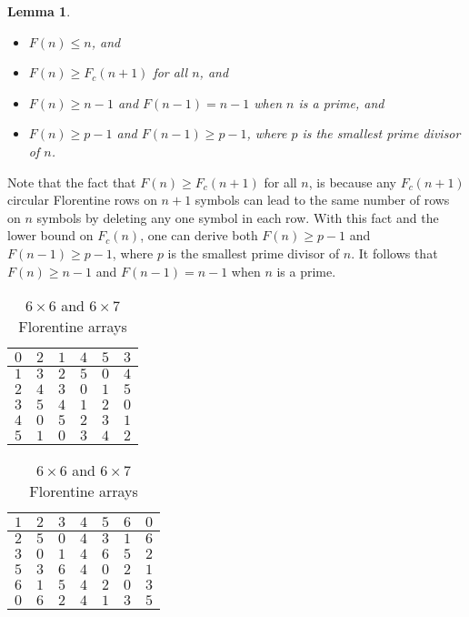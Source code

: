 \documentclass[conference,letterpaper]{IEEEtran}
\newtheorem{lemma}{Lemma}
\theoremstyle{definition}
\begin{document}
\begin{lemma}\cite{TAYLOR1991}\label{FB}
\begin{itemize}
\item[(1)]$F(n)\leq n$, and
\item[(2)]$F(n) \geq F_{c}(n+1)$ for all $n$, and
\item[(3)] $F(n) \geq n-1$ and $F(n-1) = n-1$ when $n$ is a prime, and 
\item[(4)] $F(n) \geq p-1$ and $F(n-1) \geq p-1$, where $p$ is the smallest prime divisor of $n$.
\end{itemize}
\end{lemma}

Note that  the fact that $F(n) \geq F_{c}(n+1)$ for all $n$, is because any $F_{c}(n+1)$ circular Florentine rows on $n+1$ symbols can lead to the same number of rows on $n$ symbols by deleting any one symbol in each row.  With this fact and the lower bound on  $F_{c}(n)$, one can derive both $F(n) \geq p-1$ and $F(n-1) \geq p-1$, where $p$ is the smallest prime divisor of 
$n$. It follows that $F(n) \geq n-1$ and $F(n-1) = n-1$ when $n$ is a prime.

\begin{table}[!h]
\caption{ $6 \times 6$  and $6 \times 7$ Florentine arrays \cite{Colbourn}}

\parbox{.4\linewidth}{
\centering
\begin{tabular}{|c|c|c|c|c|c|}
\hline
$ 0$ & $2$ & $1$ & $4$ & $5$ & $3$  \\ \hline
$ 1$ & $3$ & $2$ & $5$ & $0$ & $4$  \\ \hline
$ 2$ & $4$ & $3$ & $0$ & $1$ & $5$   \\ \hline
$ 3$ & $5$ & $4$ & $1$ & $2$ & $0$   \\ \hline
$ 4$ & $0$ & $5$ & $2$ & $3$ & $1$   \\ \hline
$5$ & $1$ & $0$ & $3$ & $4$ & $2$   \\ \hline
\end{tabular}
\label{Florentineexample}
}	
\hfill
\parbox{.5\linewidth}{
\centering
\begin{tabular}{|c|c|c|c|c|c|c|}
\hline
$ 1$ & $2$ & $3$ & $4$ & $5$ & $6$ & $0$  \\ \hline
$ 2$ & $5$ & $0$ & $4$ & $3$ & $1$ & $6$  \\ \hline
$ 3$ & $0$ & $1$ & $4$ & $6$ & $5$ & $2$  \\ \hline
$ 5$ & $3$ & $6$ & $4$ & $0$ & $2$ & $1$  \\ \hline
$ 6$ & $1$ & $5$ & $4$ & $2$ & $0$ & $3$  \\ \hline
$0$ & $6$ & $2$ & $4$ & $1$ & $3$ & $5$  \\ \hline
\end{tabular}	
}
\end{table}
\end{document}
